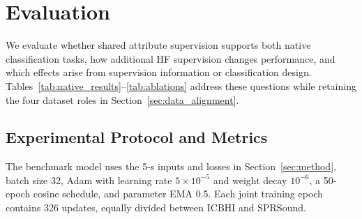 
\section{Evaluation}
\label{sec:evaluation}

We evaluate whether shared attribute supervision supports both native
classification tasks, how additional HF supervision changes performance,
and which effects arise from supervision information or classification
design. Tables~\ref{tab:native_results}--\ref{tab:ablations} address these
questions while retaining the four dataset roles in Section~\ref{sec:data_alignment}.

\subsection{Experimental Protocol and Metrics}
\label{sec:protocol}
The benchmark model uses the 5-s inputs and losses in Section~\ref{sec:method},
batch size 32, Adam with learning rate $5\times10^{-5}$ and weight decay
$10^{-6}$, a 50-epoch cosine schedule, and parameter EMA 0.5. Each joint
training epoch contains 326 updates, equally divided between ICBHI and SPRSound.

